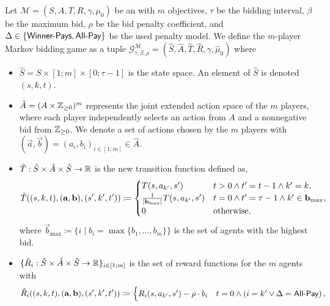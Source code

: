 \begin{definition}\label{def:markov game}
    Let \(\mathcal{M} = (S, A, T, R, \gamma, \mu_0)\) be an \momdp with \(m\) objectives, $\tau$ be the bidding interval, $\beta$ be the maximum bid, $\rho$ be the bid penalty coefficient, and $\Delta\in \{ \textsf{Winner-Pays},\textsf{All-Pay}\}$ be the used penalty model.
    We define the \(m\)-player Markov bidding game as a tuple \(\mathcal{G}^{\mathcal{M}}_{\tau,\beta,\rho} = (\hat S, \hat{A}, \hat{T}, \hat{R}, \gamma, \hat \mu_0)\) where
    \begin{itemize}
        \item \(\hat S = S \times [1;m] \times [0;\tau - 1]\) is the state space. An element of \(\hat S\) is denoted \((s, k, t)\).
        \item \(\hat{A} = (A \times \mathbb{Z}_{\geq 0})^m\) represents the joint extended action space of the \(m\) players, where each player independently selects an action from \(A\) and a nonnegative bid from $\mathbb{Z}_{\geq 0}$. We denote a set of actions chosen by the \(m\) players with \((\vec a, \vec b) = (a_i, b_i)_{i \in [1;m]} \in \hat{A}\).
        \item \(\hat{T} : \hat S \times \hat{A} \times \hat S \to \mathbb{R}\) is the new transition function defined as,
        \begin{equation*}
            \hat T((s, k, t), (\mathbf{a}, \mathbf{b}), (s', k', t')) \coloneqq 
            \begin{cases}
                T(s, a_{k'}, s') & t >0\land t' = t-1 \land k'=k,  \\
                \frac{1}{\left|\mathbf{b}_{\max}\right|} T(s, a_{k'}, s') & t = 0 \wedge t' = \tau-1 \wedge k' \in \mathbf{b}_{\max}, \\
                0 & \text{otherwise},
            \end{cases}
        \end{equation*}
        where \(\vec b_{\max} \coloneqq \{i \mid b_i = \max \{b_1, \dots, b_m\}\}\) is the set of agents with the highest bid.
        \item \(\{\hat{R}_i : \hat S \times \hat{A} \times \hat S \to \mathbb{R}\}_{i \in [1; m]}\) is the set of reward functions for the \(m\) agents with
        \begin{equation*}
            \hat{R}_i((s, k, t), (\mathbf{a}, \mathbf{b}), (s', k', t')) \coloneqq 
            \begin{cases}
                R_i(s, a_{k'}, s') - \rho \cdot b_{i} & t = 0 \land \left( i = k' \lor \Delta = \textsf{All-Pay} \right),\\

\end{cases}
\end{equation*}
\end{itemize}
\end{definition}
